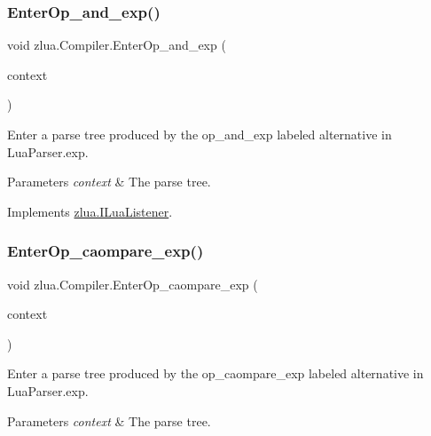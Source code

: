 \subsubsection{\texorpdfstring{Enter\+Op\+\_\+and\+\_\+exp()}{EnterOp\_and\_exp()}}
{\footnotesize\ttfamily void zlua.\+Compiler.\+Enter\+Op\+\_\+and\+\_\+exp (\begin{DoxyParamCaption}\item[{\mbox{[}\+Not\+Null\mbox{]} \mbox{\hyperlink{classzlua_1_1_lua_parser_1_1_op__and__exp_context}{Lua\+Parser.\+Op\+\_\+and\+\_\+exp\+Context}}}]{context }\end{DoxyParamCaption})}



Enter a parse tree produced by the {\ttfamily op\+\_\+and\+\_\+exp} labeled alternative in Lua\+Parser.\+exp. 


\begin{DoxyParams}{Parameters}
{\em context} & The parse tree.\\
\hline
\end{DoxyParams}


Implements \mbox{\hyperlink{interfacezlua_1_1_i_lua_listener_a12bd95b1347e95dcdcdc7d2fdc22558b}{zlua.\+I\+Lua\+Listener}}.

\mbox{\label{classzlua_1_1_compiler_a3ee6eb43c518439f5e6df2496d4bd45f}} 
\subsubsection{\texorpdfstring{Enter\+Op\+\_\+caompare\+\_\+exp()}{EnterOp\_caompare\_exp()}}
{\footnotesize\ttfamily void zlua.\+Compiler.\+Enter\+Op\+\_\+caompare\+\_\+exp (\begin{DoxyParamCaption}\item[{\mbox{[}\+Not\+Null\mbox{]} \mbox{\hyperlink{classzlua_1_1_lua_parser_1_1_op__caompare__exp_context}{Lua\+Parser.\+Op\+\_\+caompare\+\_\+exp\+Context}}}]{context }\end{DoxyParamCaption})}



Enter a parse tree produced by the {\ttfamily op\+\_\+caompare\+\_\+exp} labeled alternative in Lua\+Parser.\+exp. 


\begin{DoxyParams}{Parameters}
{\em context} & The parse tree.\\
\hline
\end{DoxyParams}


